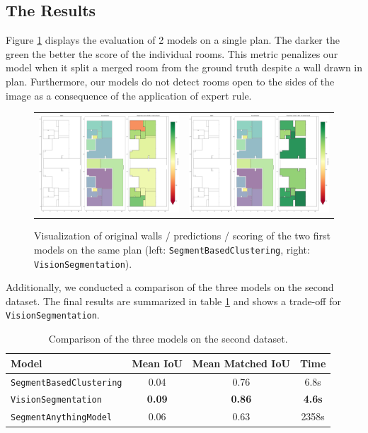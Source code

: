 \documentclass[11pt]{article}
\begin{document}
\subsection{The Results}
Figure \ref{fig:result_segmentation} displays the evaluation of 2 models on a single 
plan. The darker the green the better the score of the individual rooms. This metric 
penalizes our model when it split a merged room from the ground truth despite a 
wall drawn in plan. Furthermore, our models do not detect rooms open to the sides
of the image as a consequence of the application of expert rule.
\begin{figure}[h]
    \centering
    \begin{tabular}{cc}
        \includegraphics[width=0.45\linewidth]{figures/ScoreSeg.png} &
        \includegraphics[width=0.45\linewidth]{figures/ScoreCV.png} \\
        
    \end{tabular}
    \caption{Visualization of original walls / predictions / scoring of the two first models 
    on the same plan
    (left: \texttt{SegmentBasedClustering}, right: \texttt{VisionSegmentation}).}
    \label{fig:result_segmentation}
\end{figure}

Additionally, we conducted a comparison of the three models on the second dataset.
The final results are summarized in table \ref{tab:results} and shows a trade-off 
for \texttt{VisionSegmentation}.
\begin{table}[ht!]
    \centering
    \begin{tabular}{|l|c|c|c|}
        \hline
        \textbf{Model} & \textbf{Mean IoU} & \textbf{Mean Matched IoU} & \textbf{Time} \\
        \hline
        \texttt{SegmentBasedClustering} & 0.04 & 0.76 & 6.8s \\
        \texttt{VisionSegmentation} & \textbf{0.09} & \textbf{0.86} & \textbf{4.6s} \\
        \texttt{SegmentAnythingModel} & 0.06 & 0.63 & 2358s \\
        \hline
    \end{tabular}
    \caption{Comparison of the three models on the second dataset.}
    \label{tab:results}
\end{table}
\end{document}
